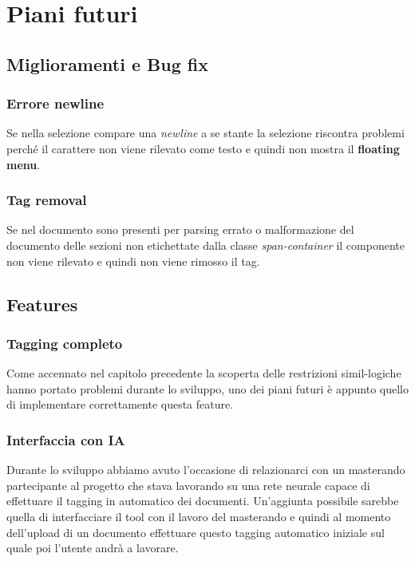 \documentclass[twoside]{supsistudent}
\begin{document}
\chapter{Piani futuri}

\section{Miglioramenti e Bug fix}

\subsection{Errore newline}

Se nella selezione compare una \textit{newline} a se stante la selezione 
riscontra problemi perché il carattere non viene rilevato come testo e quindi
non mostra il \textbf{floating menu}.

\subsection{Tag removal}

Se nel documento sono presenti per parsing errato o malformazione del documento
delle sezioni non etichettate dalla classe \textit{span-container} il 
componente non viene rilevato e quindi non viene rimosso il tag.

\section{Features}

\subsection{Tagging completo}

Come accennato nel capitolo precedente la scoperta delle restrizioni
simil-logiche hanno portato problemi durante lo sviluppo, uno dei piani futuri
è appunto quello di implementare correttamente questa feature.

\subsection{Interfaccia con IA}

Durante lo sviluppo abbiamo avuto l'occasione di relazionarci con un 
masterando partecipante al progetto che stava lavorando su una rete neurale
capace di effettuare il tagging in automatico dei documenti. Un'aggiunta
possibile sarebbe quella di interfacciare il tool con il lavoro del masterando
e quindi al momento dell'upload di un documento effettuare questo tagging
automatico iniziale sul quale poi l'utente andrà a lavorare.
\end{document}

